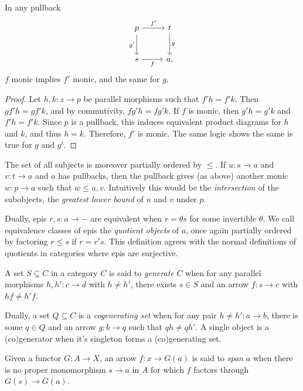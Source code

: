 \begin{lemma}\label{lma:5.2}
	In any pullback
	\[\begin{tikzcd}[row sep = 2.5em, column sep = 2.5em]
	p\ar[" f' ", r] \ar[" g' "', d]  & t\ar[" g ", d]  \\
	s\ar[" f "', r]  & a,
	\end{tikzcd}\]
	$f$ monic implies $f'$ monic, and the same for $g$.
\end{lemma}
\begin{proof}
	Let $h,k : z \to p$ be parallel morphisms such that $f'h=f'k$. Then $gf'h=gf'k$, and by commutivity, $fg'h=fg'k$. If $f$ is monic, then $g'h=g'k$ and $f'h=f'k$. Since $p$ is a pullback, this induces equivalent product diagrams for $h$ and $k$, and thus $h=k$. Therefore, $f'$ is monic. The same logic shows the same is true for $g$ and $g'$.
\end{proof}

The set of all subjects is moreover partially ordered by $\leq $. If $u : s \to a$ and $v : t \to a$ and $a$ has pullbacks, then the pullback gives (as above) another monic $w : p \to a$ such that $w\leq u,v$. Intuitively this would be the \emph{intersection} of the subobjects, the \emph{greatest lower bound} of $u$ and $v$ under $p$.

Dually, epis $r,s : a \to -$ are equivalent when $r=\theta s$ for some invertible $\theta$. We call equivalence classes of epis the \emph{quotient objects} of $a$, once again partially ordered by factoring $r\leq s$ if $r=r's$. This definition agrees with the normal definitions of quotients in categories where epis are surjective.

\begin{definition}\label{dfn:5.5}
	A set $S\subseteq C$ in a category $C$ is said to \emph{generate} $C$ when for any parallel morphisms $h,h': c \to d$ with $h\neq h'$, there exists $s\in S$ and an arrow $f : s \to c$ with $hf\neq h'f$.

	Dually, a set $Q\subseteq C$ is a \emph{cogenerating set} when for any pair $h\neq h': a \to b$, there is some $q\in Q$ and an arrow $g : b \to q$ such that $qh\neq qh'$. A single object is a (co)generator when it's singleton forms a (co)generating set.
\end{definition}


Given a functor $G : A \to X$, an arrow $f : x \to G(a)$ is said to \emph{span} $a$ when there is no proper monomorphism $s\to a$ in $A$ for which $f$ factors through $G(s)\to G(a)$.

